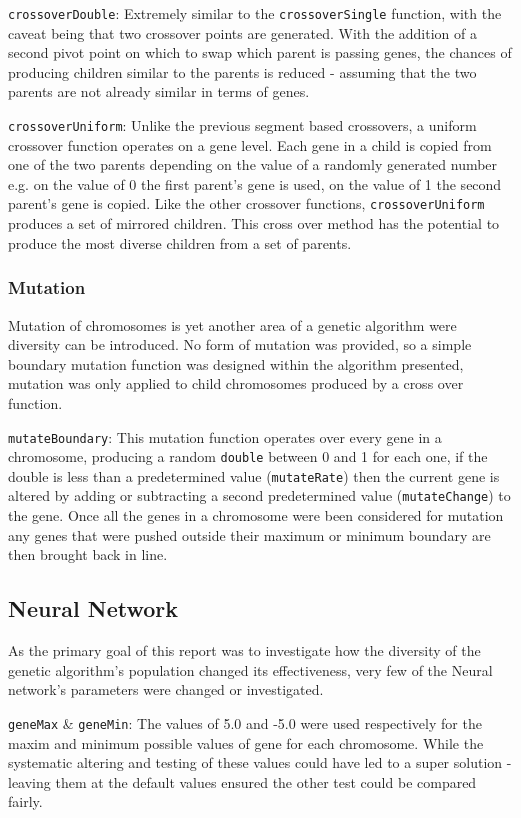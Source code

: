 			\texttt{crossoverDouble}: Extremely similar to the  \texttt{crossoverSingle} function, with the caveat being that two crossover points are generated. With the addition of a second pivot point on which to swap which parent is passing genes, the chances of producing children similar to the parents is reduced - assuming that the two parents are not already similar in terms of genes.
			
			\texttt{crossoverUniform}: Unlike the previous segment based crossovers, a uniform crossover function operates on a gene level. Each gene in a child is copied from one of the two parents depending on the value of a randomly generated number e.g. on the value of 0 the first parent's gene is used, on the value of 1 the second parent's gene is copied. Like the other crossover functions, \texttt{crossoverUniform} produces a set of mirrored children. This cross over method has the potential to produce the most diverse children from a set of parents. 
			
		\subsubsection{Mutation}
			Mutation of chromosomes is yet another area of a genetic algorithm were diversity can be introduced. No form of mutation was provided, so a simple boundary mutation function was designed within the algorithm presented, mutation was only applied to child chromosomes produced by a cross over function.
			
			\texttt{mutateBoundary}: This mutation function operates over every gene in a chromosome, producing a random \texttt{double} between 0 and 1 for each one, if the double is less than a predetermined value (\texttt{mutateRate}) then the current gene is altered by adding  or subtracting a second predetermined value (\texttt{mutateChange}) to the gene. Once all the genes in a chromosome were been considered for mutation any genes that were pushed outside their maximum or minimum boundary are then brought back in line.
		
	\subsection{Neural Network}
		As the primary goal of this report was to investigate how the diversity of the genetic algorithm's population changed its effectiveness, very few of the Neural network's parameters were changed or investigated.
		
		\texttt{geneMax} \& \texttt{geneMin}: The values of 5.0 and -5.0 were used respectively for the maxim and minimum possible values of gene for each chromosome. While the systematic altering and testing of these values could have led to a super solution - leaving them at the default values ensured the other test could be compared fairly.
		
